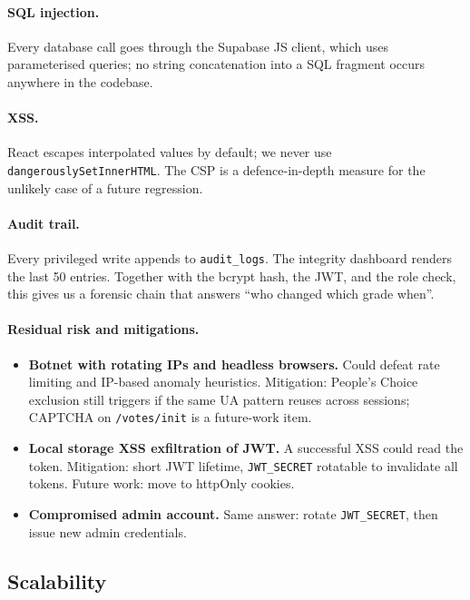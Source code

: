 \paragraph{SQL injection.} Every database call goes through the Supabase
JS client, which uses parameterised queries; no string concatenation
into a SQL fragment occurs anywhere in the codebase.

\paragraph{XSS.} React escapes interpolated values by default; we never
use \texttt{dangerouslySetInnerHTML}. The CSP is a defence-in-depth
measure for the unlikely case of a future regression.

\paragraph{Audit trail.} Every privileged write appends to
\texttt{audit\_logs}. The integrity dashboard renders the last 50 entries.
Together with the bcrypt hash, the JWT, and the role check, this gives
us a forensic chain that answers ``who changed which grade when''.

\paragraph{Residual risk and mitigations.}
\begin{itemize}[leftmargin=*]
  \item \textbf{Botnet with rotating IPs and headless browsers.} Could
        defeat rate limiting and IP-based anomaly heuristics.
        Mitigation: People's Choice exclusion still triggers if the same
        UA pattern reuses across sessions; CAPTCHA on
        \texttt{/votes/init} is a future-work item.
  \item \textbf{Local storage XSS exfiltration of JWT.} A successful XSS
        could read the token. Mitigation: short JWT lifetime,
        \texttt{JWT\_SECRET} rotatable to invalidate all tokens. Future
        work: move to httpOnly cookies.
  \item \textbf{Compromised admin account.} Same answer: rotate
        \texttt{JWT\_SECRET}, then issue new admin credentials.
\end{itemize}

\subsection{Scalability}

